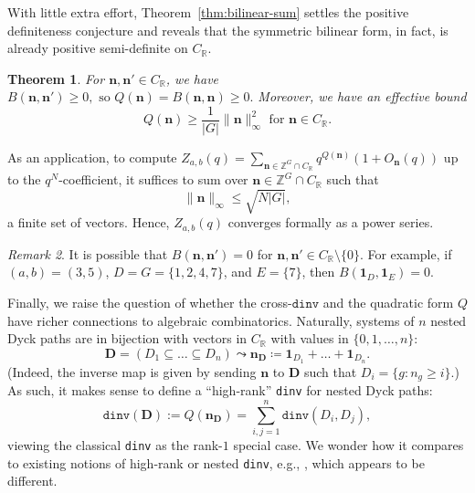 \documentclass[11pt,reqno]{amsart}
\newtheorem{theorem}{Theorem}[section]
\theoremstyle{remark}
\newtheorem{remark}[theorem]{Remark}
\begin{document}
With little extra effort, Theorem~\ref{thm:bilinear-sum} settles the positive definiteness conjecture and reveals that the symmetric bilinear form, in fact, is already positive semi-definite on $C_{\mathbb{R}}$.

\begin{theorem}\label{thm:pos-def}
    For $\mathbf{n},\mathbf{n'}\in C_{\mathbb{R}}$, we have
    \( B(\mathbf{n},\mathbf{n'})\geq 0,\text{ so }Q(\mathbf{n})=B(\mathbf{n},\mathbf{n})\geq 0.\)
    Moreover, we have an effective bound
    \[ Q(\mathbf{n}) \ge \frac{1}{|G|} \|\mathbf{n}\|_{\infty}^2 \text{ for }\mathbf{n}\in C_{\mathbb{R}}. \]
\end{theorem}

As an application, to compute $Z_{a,b}(q)=\sum_{\mathbf{n}\in \mathbb{Z}^G\cap C_{\mathbb{R}}} q^{Q(\mathbf{n})}(1+O_{\mathbf{n}}(q))$ up to the $q^N$-coefficient, it suffices to sum over $\mathbf{n}\in \mathbb{Z}^G\cap C_{\mathbb{R}}$ such that
\[ \lVert \mathbf{n}\rVert_\infty \leq \sqrt{N|G|},\] 
a finite set of vectors. Hence, $Z_{a,b}(q)$ converges formally as a power series.

\begin{remark}\label{rmk:counterexample}
    It is possible that $B(\mathbf{n},\mathbf{n'})=0$ for $\mathbf{n},\mathbf{n'}\in C_\mathbb{R}\setminus \{0\}$. For example, if $(a,b)=(3,5)$, $D=G=\{1,2,4,7\}$, and $E=\{7\}$, then $B(\mathbf{1}_D,\mathbf{1}_E)=0$.
\end{remark}

Finally, we raise the question of whether the cross-$\mathtt{dinv}$ and the quadratic form $Q$ have richer connections to algebraic combinatorics. Naturally, systems of $n$ nested Dyck paths are in bijection with vectors in $C_\mathbb{R}$ with values in $\{0,1,\dots,n\}$:
\[ \mathbf{D}=(D_1\subseteq \dots \subseteq D_n) \leadsto \mathbf{n}_\mathbf{D}\coloneq \mathbf{1}_{D_1}+\dots+\mathbf{1}_{D_n}.\]
(Indeed, the inverse map is given by sending $\mathbf{n}$ to $\mathbf{D}$ such that $D_i=\{g:n_g\geq i\}$.) As such, it makes sense to define a ``high-rank'' \texttt{dinv} for nested Dyck paths:
\[ \mathtt{dinv}(\mathbf{D}):=Q(\mathbf{n}_\mathbf{D})=\sum_{i,j=1}^n \mathtt{dinv}(D_i,D_j),\]
viewing the classical \texttt{dinv} as the rank-$1$ special case. We wonder how it compares to existing notions of high-rank or nested \texttt{dinv}, e.g., \cite{LW08}, which appears to be different.
\end{document}
